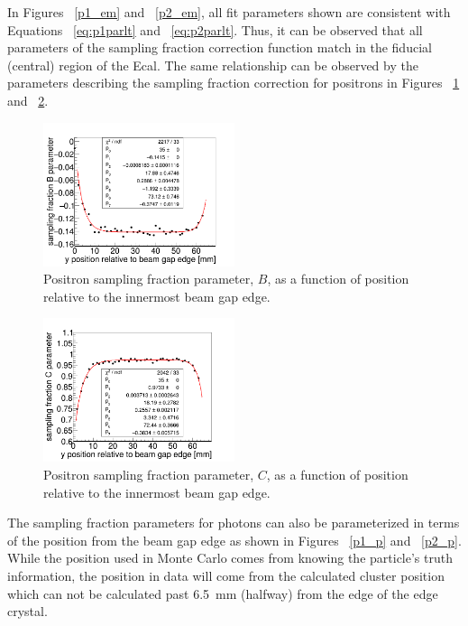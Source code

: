\documentclass[twoside]{article}
\begin{document}
\begin{multicols}{2}
In Figures ~\ref{p1_em} and ~\ref{p2_em}, all fit parameters shown are consistent with Equations ~\eqref{eq:p1parlt} and ~\eqref{eq:p2parlt}. Thus, it can be observed that all parameters of the sampling fraction correction function match in the fiducial (central) region of the Ecal. The same relationship can be observed by the parameters describing the sampling fraction correction for positrons in Figures ~\ref{p1_ep} and ~\ref{p2_ep}.

\begin{figure}[H]
  \centering
      \includegraphics[width=0.5\textwidth]{pics/p0_ep.png}
  \caption{Positron sampling fraction parameter, $B$, as a function of position relative to the innermost beam gap edge.}
  \label{p1_ep}
\end{figure} 

\begin{figure}[H]
  \centering
      \includegraphics[width=0.5\textwidth]{pics/p1_ep.png}
  \caption{Positron sampling fraction parameter, $C$, as a function of position relative to the innermost beam gap edge.}
  \label{p2_ep}
\end{figure} 

The sampling fraction parameters for photons can also be parameterized in terms of the position from the beam gap edge as shown in Figures ~\ref{p1_p} and ~\ref{p2_p}. While the position used in Monte Carlo comes from knowing the particle's truth information, the position in data will come from the calculated cluster position which can not be calculated past 6.5~mm (halfway) from the edge of the edge crystal. 


\end{multicols}
\end{document}
